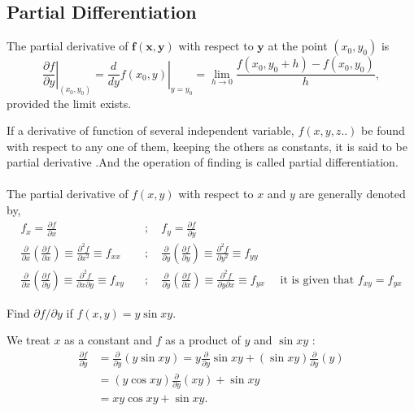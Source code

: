 \subsection{Partial Differentiation}\label{partial diferentiation}
\begin{definition}
	The partial derivative of $\boldsymbol{f}(\boldsymbol{x}, \boldsymbol{y})$ with respect to $\boldsymbol{y}$ at the point $\left(x_{0}, y_{0}\right)$ is
	$$
	\left.\frac{\partial f}{\partial y}\right|_{\left(x_{0}, y_{0}\right)}=\left.\frac{d}{d y} f\left(x_{0}, y\right)\right|_{y=y_{0}}=\lim _{h \rightarrow 0} \frac{f\left(x_{0}, y_{0}+h\right)-f\left(x_{0}, y_{0}\right)}{h},
	$$
	provided the limit exists.
\end{definition}
If a derivative of function of several independent variable, $f(x,y,z..)$ be found with respect to any one of them, keeping the others as constants, it is said to be partial derivative .And the operation of finding is called partial differentiation.
\\\\The partial derivative of $f(x, y)$ with respect to $x$ and $y$ are generally denoted by,
\begin{align*}f_{x}=\frac{\partial f}{\partial x}\quad &;\quad f_{y}=\frac{\partial f}{\partial y}\\
 \frac{\partial}{\partial x}\left(\frac{\partial f}{\partial x}\right) \equiv \frac{\partial^{2} f}{\partial x^{2}} \equiv f_{x x}\quad &;\quad \frac{\partial}{\partial y}\left(\frac{\partial f}{\partial y}\right) \equiv \frac{\partial^{2} f}{\partial y^{2}} \equiv f_{y y} \\
	\frac{\partial}{\partial x}\left(\frac{\partial f}{\partial y}\right) \equiv \frac{\partial^{2} f}{\partial x \partial y} \equiv f_{x y} \quad &;\quad \frac{\partial}{\partial y}\left(\frac{\partial f}{\partial x}\right) \equiv \frac{\partial^{2} f}{\partial y \partial x} \equiv f_{y x}\quad \text { it is given that } f_{x y}=f_{y x}
\end{align*}
\begin{exercise}
	Find $\partial f / \partial y$ if $f(x, y)=y \sin x y$.
	
\end{exercise}
\begin{answer}
We treat $x$ as a constant and $f$ as a product of $y$ and $\sin x y$ :
\begin{align*}
\frac{\partial f}{\partial y} &=\frac{\partial}{\partial y}(y \sin x y)=y \frac{\partial}{\partial y} \sin x y+(\sin x y) \frac{\partial}{\partial y}(y) \\
&=(y \cos x y) \frac{\partial}{\partial y}(x y)+\sin x y\\&=x y \cos x y+\sin x y .
\end{align*}
\end{answer}
